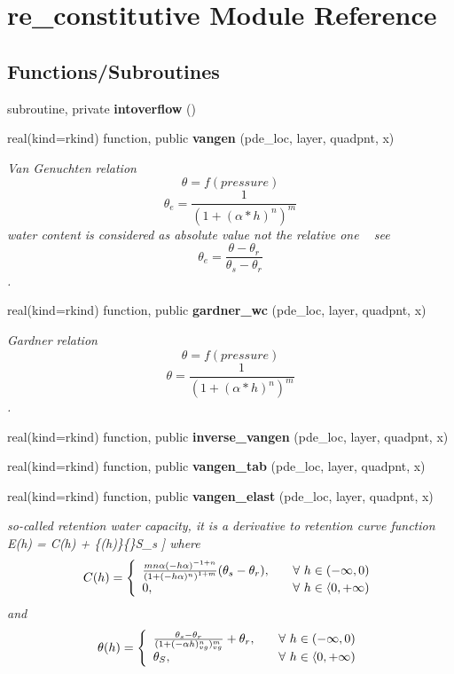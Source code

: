 \section{re\+\_\+constitutive Module Reference}
\label{namespacere__constitutive}
\subsection*{Functions/\+Subroutines}
\begin{DoxyCompactItemize}
\item 
subroutine, private {\bf intoverflow} ()
\item 
real(kind=rkind) function, public {\bf vangen} (pde\+\_\+loc, layer, quadpnt, x)
\begin{DoxyCompactList}\small\item\em Van Genuchten relation \[ \theta = f(pressure) \] \[ \theta_e = \frac{1}{(1+(\alpha*h)^n)^m} \] water content is considered as absolute value not the relative one ~\newline
 see \[ \theta_e = \frac{\theta - \theta_r}{\theta_s-\theta_r} \]. \end{DoxyCompactList}\item 
real(kind=rkind) function, public {\bf gardner\+\_\+wc} (pde\+\_\+loc, layer, quadpnt, x)
\begin{DoxyCompactList}\small\item\em Gardner relation \[ \theta = f(pressure) \] \[ \theta = \frac{1}{(1+(\alpha*h)^n)^m} \]. \end{DoxyCompactList}\item 
real(kind=rkind) function, public {\bf inverse\+\_\+vangen} (pde\+\_\+loc, layer, quadpnt, x)
\item 
real(kind=rkind) function, public {\bf vangen\+\_\+tab} (pde\+\_\+loc, layer, quadpnt, x)
\item 
real(kind=rkind) function, public {\bf vangen\+\_\+elast} (pde\+\_\+loc, layer, quadpnt, x)
\begin{DoxyCompactList}\small\item\em so-\/called retention water capacity, it is a derivative to retention curve function  E(h) = C(h) + \{(h)\}\{\}S\+\_\+s ] where \[ C(h) = \left\{ \begin{array}{l l}\frac{m n \alpha (-h \alpha )^{-1+n}}{\left(1+(-h \alpha )^n\right)^{1+m}}(\theta_s - \theta_r) , & \quad \mbox{$\forall$ $h \in (-\infty, 0 )$}\\ 0, & \quad \mbox{$\forall$ $h \in \langle 0, + \infty )$}\\ \end{array} \right. \] and \[ \theta(h) = \left\{ \begin{array}{l l} \frac{\theta_s -\theta_r}{(1+(-\alpha h)^n_{vg})^m_{vg}} + \theta_r, & \quad \mbox{$\forall$ $h \in (-\infty, 0 )$}\\ \theta_S, & \quad \mbox{$\forall$ $h \in \langle 0, + \infty )$}\\ \end{array} \right. \] \end{DoxyCompactList}\item 

\end{DoxyCompactItemize}
